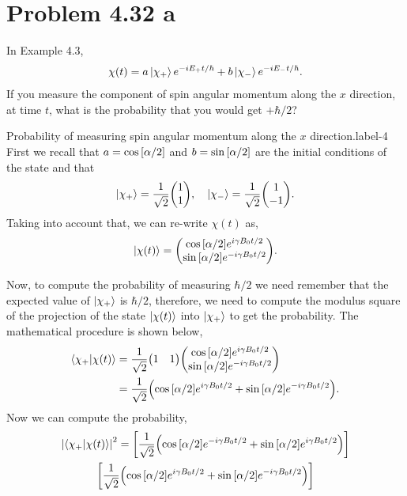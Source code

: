 \documentclass[../main.tex]{subfiles}
\begin{document}
\section{Problem 4.32 a}

In Example 4.3,
\begin{align*}
    \chi\qty(t) = a\ket{\chi_+} e^{-iE_+t/\hbar }+b\ket{\chi_-} e^{-iE_-t/\hbar }.
\end{align*}
If you measure the component of spin angular momentum along the $x$ direction, at time $t$, what is the probability that you would get $+\hbar/2$?

\begin{sol}{Probability of measuring spin angular momentum along the $x$ direction.}{label-4}
    First we recall that $a=\cos\qty[\alpha/2]$ and $b=\sin\qty[\alpha/2]$ are the initial conditions of the state and that
    \begin{gather*}
        \ket{\chi_+} = \frac{1}{\sqrt{2}}\mqty(1\\1),\quad
        \ket{\chi_-} = \frac{1}{\sqrt{2}}\mqty(1\\-1).
    \end{gather*}
    Taking into account that, we can re-write $\chi(t)$ as,
    \begin{align*}
        \ket{\chi\qty(t)} = \mqty(\cos\qty[\alpha/2]e^{i\gamma B_0t/2 }\\\sin\qty[\alpha/2]e^{-i\gamma B_0t/2 }).
    \end{align*}

    Now, to compute the probability of measuring $\hbar/2$ we need remember that the expected value of $\ket{\chi_+}$ is $\hbar/2$, therefore, we need to compute the modulus square of the projection of the state $\ket{\chi\qty(t)}$ into $\ket{\chi_+}$ to get the probability.
    The mathematical procedure is shown below,
    \begin{align*}
        \braket{\chi_+}{\chi\qty(t)} &= \frac{1}{\sqrt{2}}\mqty(1&1)\mqty(\cos\qty[\alpha/2]e^{i\gamma B_0t/2}\\\sin\qty[\alpha/2]e^{-i\gamma B_0t/2 }) \\
                                     &= \frac{1}{\sqrt{2}}\qty(\cos\qty[\alpha/2]e^{i\gamma B_0t/2}+\sin\qty[\alpha/2]e^{-i\gamma B_0t/2}).
    \end{align*}
    Now we can compute the probability,
    \begin{multline*}
        \abs{\braket{\chi_+}{\chi\qty(t)}}^2 = 
            \left[
                \frac{1}{\sqrt{2}}\qty(\cos\qty[\alpha/2]e^{-i\gamma B_0t/2}+\sin\qty[\alpha/2]e^{i\gamma B_0t/2})
            \right] \\
            \left[
                \frac{1}{\sqrt{2}}\qty(\cos\qty[\alpha/2]e^{i\gamma B_0t/2}+\sin\qty[\alpha/2]e^{-i\gamma B_0t/2})
            \right]
    \end{multline*}


\end{sol}
\end{document}
